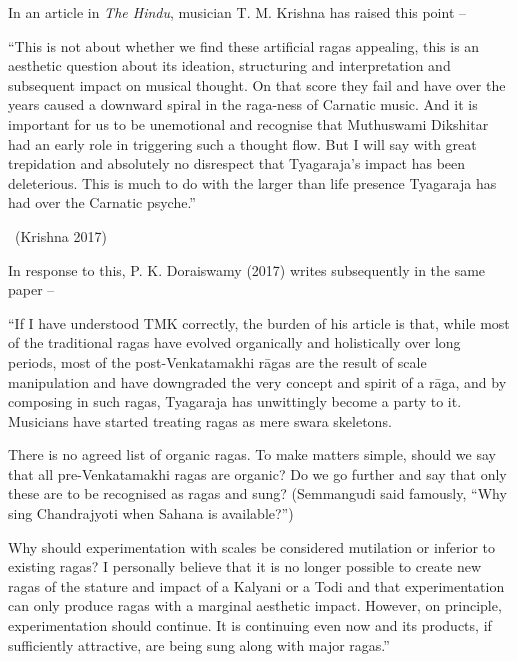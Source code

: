 In an article in \textit{The Hindu}, musician T. M. Krishna has raised this point –

\begin{myquote}
“This is not about whether we find these artificial ragas appealing, this is an aesthetic question about its ideation, structuring and interpretation and subsequent impact on musical thought. On that score they fail and have over the years caused a downward spiral in the raga-ness of Carnatic music. And it is important for us to be unemotional and recognise that Muthuswami Dikshitar had an early role in triggering such a thought flow. But I will say with great trepidation and absolutely no disrespect that Tyagaraja’s impact has been deleterious. This is much to do with the larger than life presence Tyagaraja has had over the Carnatic psyche.” 

~\hfill (Krishna 2017)
\end{myquote}

In response to this, P. K. Doraiswamy (2017) writes subsequently in the same paper –

\begin{myquote}
“If I have understood TMK correctly, the burden of his article is that, while most of the traditional ragas have evolved organically and holistically over long periods, most of the post-Venkatamakhi rāgas are the result of scale manipulation and have downgraded the very concept and spirit of a rāga, and by composing in such ragas, Tyagaraja has unwittingly become a party to it. Musicians have started treating ragas as mere swara skeletons.
\end{myquote}

\begin{myquote}
There is no agreed list of organic ragas. To make matters simple, should we say that all pre-Venkatamakhi ragas are organic? Do we go further and say that only these are to be recognised as ragas and sung? (Semmangudi said famously, “Why sing Chandrajyoti when Sahana is available?”)
\end{myquote}

\begin{myquote}
Why should experimentation with scales be considered mutilation or inferior to existing ragas? I personally believe that it is no longer possible to create new ragas of the stature and impact of a Kalyani or a Todi and that experimentation can only produce ragas with a marginal aesthetic impact. However, on principle, experimentation should continue. It is continuing even now and its products, if sufficiently attractive, are being sung along with major ragas.”
\end{myquote}


